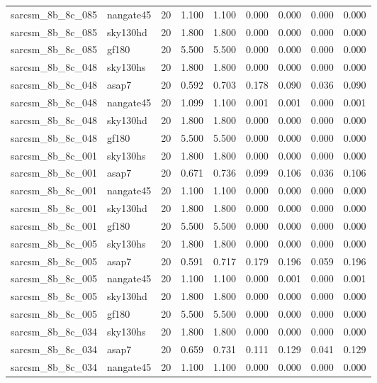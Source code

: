 \begin{tabular}{llrrrrrrr}
sarcsm\_8b\_8c\_085 & nangate45 & 20 & 1.100 & 1.100 & 0.000 & 0.000 & 0.000 & 0.000 \\
sarcsm\_8b\_8c\_085 & sky130hd & 20 & 1.800 & 1.800 & 0.000 & 0.000 & 0.000 & 0.000 \\
sarcsm\_8b\_8c\_085 & gf180 & 20 & 5.500 & 5.500 & 0.000 & 0.000 & 0.000 & 0.000 \\
sarcsm\_8b\_8c\_048 & sky130hs & 20 & 1.800 & 1.800 & 0.000 & 0.000 & 0.000 & 0.000 \\
sarcsm\_8b\_8c\_048 & asap7 & 20 & 0.592 & 0.703 & 0.178 & 0.090 & 0.036 & 0.090 \\
sarcsm\_8b\_8c\_048 & nangate45 & 20 & 1.099 & 1.100 & 0.001 & 0.001 & 0.000 & 0.001 \\
sarcsm\_8b\_8c\_048 & sky130hd & 20 & 1.800 & 1.800 & 0.000 & 0.000 & 0.000 & 0.000 \\
sarcsm\_8b\_8c\_048 & gf180 & 20 & 5.500 & 5.500 & 0.000 & 0.000 & 0.000 & 0.000 \\
sarcsm\_8b\_8c\_001 & sky130hs & 20 & 1.800 & 1.800 & 0.000 & 0.000 & 0.000 & 0.000 \\
sarcsm\_8b\_8c\_001 & asap7 & 20 & 0.671 & 0.736 & 0.099 & 0.106 & 0.036 & 0.106 \\
sarcsm\_8b\_8c\_001 & nangate45 & 20 & 1.100 & 1.100 & 0.000 & 0.000 & 0.000 & 0.000 \\
sarcsm\_8b\_8c\_001 & sky130hd & 20 & 1.800 & 1.800 & 0.000 & 0.000 & 0.000 & 0.000 \\
sarcsm\_8b\_8c\_001 & gf180 & 20 & 5.500 & 5.500 & 0.000 & 0.000 & 0.000 & 0.000 \\
sarcsm\_8b\_8c\_005 & sky130hs & 20 & 1.800 & 1.800 & 0.000 & 0.000 & 0.000 & 0.000 \\
sarcsm\_8b\_8c\_005 & asap7 & 20 & 0.591 & 0.717 & 0.179 & 0.196 & 0.059 & 0.196 \\
sarcsm\_8b\_8c\_005 & nangate45 & 20 & 1.100 & 1.100 & 0.000 & 0.001 & 0.000 & 0.001 \\
sarcsm\_8b\_8c\_005 & sky130hd & 20 & 1.800 & 1.800 & 0.000 & 0.000 & 0.000 & 0.000 \\
sarcsm\_8b\_8c\_005 & gf180 & 20 & 5.500 & 5.500 & 0.000 & 0.000 & 0.000 & 0.000 \\
sarcsm\_8b\_8c\_034 & sky130hs & 20 & 1.800 & 1.800 & 0.000 & 0.000 & 0.000 & 0.000 \\
sarcsm\_8b\_8c\_034 & asap7 & 20 & 0.659 & 0.731 & 0.111 & 0.129 & 0.041 & 0.129 \\
sarcsm\_8b\_8c\_034 & nangate45 & 20 & 1.100 & 1.100 & 0.000 & 0.000 & 0.000 & 0.000 \\

\end{tabular}
